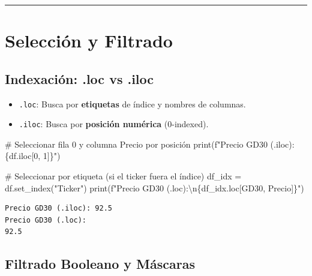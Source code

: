 \documentclass[
  spanish,
  letterpaper,
  DIV=11,
  numbers=noendperiod]{scrreprt}
\newenvironment{Shaded}{\begin{snugshade}}{\end{snugshade}}
\newcommand{\BuiltInTok}[1]{\textcolor[rgb]{0.00,0.23,0.31}{#1}}
\newcommand{\CharTok}[1]{\textcolor[rgb]{0.13,0.47,0.30}{#1}}
\newcommand{\CommentTok}[1]{\textcolor[rgb]{0.37,0.37,0.37}{#1}}
\newcommand{\DecValTok}[1]{\textcolor[rgb]{0.68,0.00,0.00}{#1}}
\newcommand{\NormalTok}[1]{\textcolor[rgb]{0.00,0.23,0.31}{#1}}
\newcommand{\OperatorTok}[1]{\textcolor[rgb]{0.37,0.37,0.37}{#1}}
\newcommand{\SpecialCharTok}[1]{\textcolor[rgb]{0.37,0.37,0.37}{#1}}
\newcommand{\SpecialStringTok}[1]{\textcolor[rgb]{0.13,0.47,0.30}{#1}}
\newcommand{\StringTok}[1]{\textcolor[rgb]{0.13,0.47,0.30}{#1}}
\providecommand{\tightlist}{%
  \setlength{\itemsep}{0pt}\setlength{\parskip}{0pt}}
\begin{document}
\begin{center}\rule{0.5\linewidth}{0.5pt}\end{center}

\section{Selección y Filtrado}\label{selecciuxf3n-y-filtrado}

\subsection{Indexación: .loc vs
.iloc}\label{indexaciuxf3n-.loc-vs-.iloc}

\begin{itemize}
\tightlist
\item
  \texttt{.loc}: Busca por \textbf{etiquetas} de índice y nombres de
  columnas.
\item
  \texttt{.iloc}: Busca por \textbf{posición numérica} (0-indexed).
\end{itemize}

\label{indexing}
\begin{Shaded}
\begin{Highlighting}[]
\CommentTok{\# Seleccionar fila 0 y columna \textquotesingle{}Precio\textquotesingle{} por posición}
\BuiltInTok{print}\NormalTok{(}\SpecialStringTok{f"Precio GD30 (.iloc): }\SpecialCharTok{\{}\NormalTok{df}\SpecialCharTok{.}\NormalTok{iloc[}\DecValTok{0}\NormalTok{, }\DecValTok{1}\NormalTok{]}\SpecialCharTok{\}}\SpecialStringTok{"}\NormalTok{)}

\CommentTok{\# Seleccionar por etiqueta (si el ticker fuera el índice)}
\NormalTok{df\_idx }\OperatorTok{=}\NormalTok{ df.set\_index(}\StringTok{"Ticker"}\NormalTok{)}
\BuiltInTok{print}\NormalTok{(}\SpecialStringTok{f"Precio GD30 (.loc):}\CharTok{\textbackslash{}n}\SpecialCharTok{\{}\NormalTok{df\_idx}\SpecialCharTok{.}\NormalTok{loc[}\StringTok{\textquotesingle{}GD30\textquotesingle{}}\NormalTok{, }\StringTok{\textquotesingle{}Precio\textquotesingle{}}\NormalTok{]}\SpecialCharTok{\}}\SpecialStringTok{"}\NormalTok{)}
\end{Highlighting}
\end{Shaded}

\begin{verbatim}
Precio GD30 (.iloc): 92.5
Precio GD30 (.loc):
92.5
\end{verbatim}

\subsection{Filtrado Booleano y
Máscaras}\label{filtrado-booleano-y-muxe1scaras}
\end{document}
